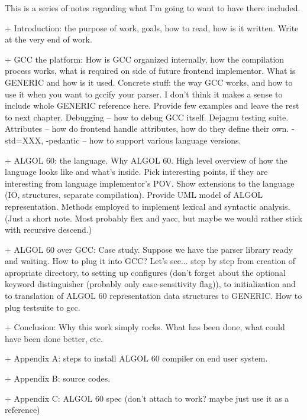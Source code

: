\documentclass[a4paper,11pt]{report}
\begin{document}
This is a series of notes regarding what I'm going to want to have
there included.

 + Introduction: the purpose of work, goals, how to read, how is it
 written.  Write at the very end of work.

 + GCC the platform: How is GCC organized internally, how the
 compilation process works, what is required on side of future
 frontend implementor.  What is GENERIC and how is it used.  Concrete
 stuff: the way GCC works, and how to use it when you want to gccify
 your parser.  I don't think it makes a sense to include whole GENERIC
 reference here.  Provide few examples and leave the rest to next
 chapter.  Debugging -- how to debug GCC itself.  Dejagnu testing
 suite.  Attributes -- how do frontend handle attributes, how do they
 define their own.  -std=XXX, -pedantic -- how to support various
 language versions.

 + ALGOL 60: the language.  Why ALGOL 60.  High level overview of how
 the language looks like and what's inside.  Pick interesting points,
 if they are interesting from language implementor's POV.  Show
 extensions to the language (IO, structures, separate compilation).
 Provide UML model of ALGOL representation.  Methods employed to
 implement lexical and syntactic analysis. (Just a short note.  Most
 probably flex and yacc, but maybe we would rather stick with
 recursive descend.)

 + ALGOL 60 over GCC: Case study.  Suppose we have the parser library
 ready and waiting.  How to plug it into GCC?  Let's see... step by
 step from creation of apropriate directory, to setting up configures
 (don't forget about the optional keyword distinguisher (probably only
 case-sensitivity flag)), to initialization and to translation of
 ALGOL 60 representation data structures to GENERIC.  How to plug
 testsuite to gcc.

 + Conclusion: Why this work simply rocks.  What has been done, what
 could have been done better, etc.

 + Appendix A: steps to install ALGOL 60 compiler on end user system.

 + Appendix B: source codes.

 + Appendix C: ALGOL 60 spec (don't attach to work? maybe just use it
 as a reference)
\end{document}
